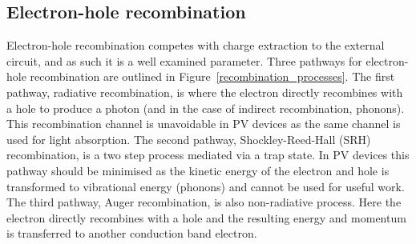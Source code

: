 
\subsection{Electron-hole recombination} \label{recombination}
Electron-hole recombination competes with charge extraction to the external circuit, and as such it is a well examined parameter. Three pathways for electron-hole recombination are outlined in Figure\ \ref{recombination_processes}. The first pathway, radiative recombination, is where the electron directly recombines with a hole to produce a photon (and in the case of indirect recombination, phonons). This recombination channel is unavoidable in PV devices as the same channel is used for light absorption. The second pathway, Shockley-Reed-Hall (SRH) recombination, is a two step process mediated via a trap state. In PV devices this pathway should be minimised as the kinetic energy of the electron and hole is transformed to vibrational energy (phonons) and cannot be used for useful work. The third pathway, Auger recombination, is also non-radiative process. Here the electron directly recombines with a hole and the resulting energy and momentum is transferred to another conduction band electron.

